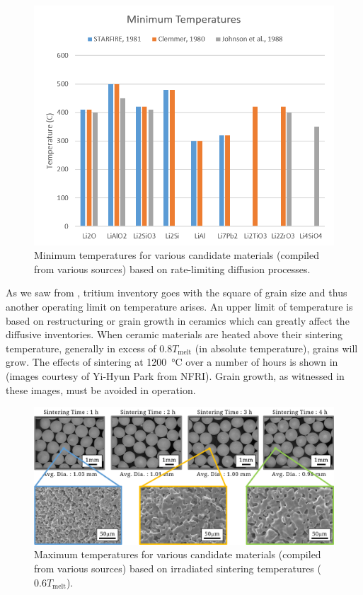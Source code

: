 \documentclass[11pt]{report} %
\begin{document}
\begin{figure}[ht]
	\centering
	\includegraphics[width=\textwidth]{images/Tmin} 
	\caption{Minimum temperatures for various candidate materials (compiled from various sources) based on rate-limiting diffusion processes.}
	\label{fig:Tmin}
\end{figure}

As we saw from , tritium inventory goes with the square of grain size and thus another operating limit on temperature arises. An upper limit of temperature is based on restructuring or grain growth in ceramics which can greatly affect the diffusive inventories. When ceramic materials are heated above their sintering temperature, generally in excess of $0.8 T_\text{melt}$ (in absolute temperature), grains will grow. The effects of sintering at \SI{1200}{\celsius} over a number of hours is shown in  (images courtesy of Yi-Hyun Park from NFRI). Grain growth, as witnessed in these images, must be avoided in operation.

\begin{figure}[ht]
	\centering
	\includegraphics[width=\textwidth]{images/material-production-NFRI} 
	\caption{Maximum temperatures for various candidate materials (compiled from various sources) based on irradiated sintering temperatures ($0.6T_\text{melt}$).}
	\label{fig:material-production-NFRI}
\end{figure}
\end{document}
